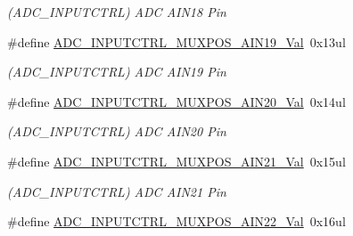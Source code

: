 \begin{DoxyCompactItemize}
\begin{DoxyCompactList}\small\item\em (A\+D\+C\+\_\+\+I\+N\+P\+U\+T\+C\+T\+R\+L) A\+D\+C A\+I\+N18 Pin \end{DoxyCompactList}\item 
\hypertarget{group___s_a_m_l21___a_d_c_ga135578a3e87f1618a959c85357e4a94f}{}\#define \hyperlink{group___s_a_m_l21___a_d_c_ga135578a3e87f1618a959c85357e4a94f}{A\+D\+C\+\_\+\+I\+N\+P\+U\+T\+C\+T\+R\+L\+\_\+\+M\+U\+X\+P\+O\+S\+\_\+\+A\+I\+N19\+\_\+\+Val}~0x13ul\label{group___s_a_m_l21___a_d_c_ga135578a3e87f1618a959c85357e4a94f}

\begin{DoxyCompactList}\small\item\em (A\+D\+C\+\_\+\+I\+N\+P\+U\+T\+C\+T\+R\+L) A\+D\+C A\+I\+N19 Pin \end{DoxyCompactList}\item 
\hypertarget{group___s_a_m_l21___a_d_c_ga26a5a3d36d0375f971b3261de71af223}{}\#define \hyperlink{group___s_a_m_l21___a_d_c_ga26a5a3d36d0375f971b3261de71af223}{A\+D\+C\+\_\+\+I\+N\+P\+U\+T\+C\+T\+R\+L\+\_\+\+M\+U\+X\+P\+O\+S\+\_\+\+A\+I\+N20\+\_\+\+Val}~0x14ul\label{group___s_a_m_l21___a_d_c_ga26a5a3d36d0375f971b3261de71af223}

\begin{DoxyCompactList}\small\item\em (A\+D\+C\+\_\+\+I\+N\+P\+U\+T\+C\+T\+R\+L) A\+D\+C A\+I\+N20 Pin \end{DoxyCompactList}\item 
\hypertarget{group___s_a_m_l21___a_d_c_ga43e2078e0fc1fded2d257c6ed7a2de77}{}\#define \hyperlink{group___s_a_m_l21___a_d_c_ga43e2078e0fc1fded2d257c6ed7a2de77}{A\+D\+C\+\_\+\+I\+N\+P\+U\+T\+C\+T\+R\+L\+\_\+\+M\+U\+X\+P\+O\+S\+\_\+\+A\+I\+N21\+\_\+\+Val}~0x15ul\label{group___s_a_m_l21___a_d_c_ga43e2078e0fc1fded2d257c6ed7a2de77}

\begin{DoxyCompactList}\small\item\em (A\+D\+C\+\_\+\+I\+N\+P\+U\+T\+C\+T\+R\+L) A\+D\+C A\+I\+N21 Pin \end{DoxyCompactList}\item 
\hypertarget{group___s_a_m_l21___a_d_c_ga3e6d02357fe37cd29c32bb6f9e8fa2b9}{}\#define \hyperlink{group___s_a_m_l21___a_d_c_ga3e6d02357fe37cd29c32bb6f9e8fa2b9}{A\+D\+C\+\_\+\+I\+N\+P\+U\+T\+C\+T\+R\+L\+\_\+\+M\+U\+X\+P\+O\+S\+\_\+\+A\+I\+N22\+\_\+\+Val}~0x16ul\label{group___s_a_m_l21___a_d_c_ga3e6d02357fe37cd29c32bb6f9e8fa2b9}


\end{DoxyCompactItemize}
